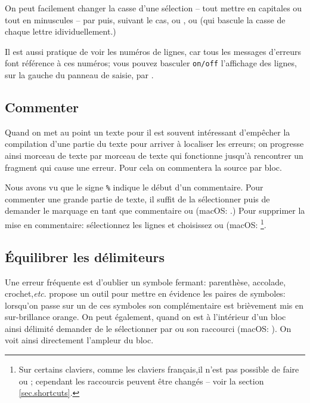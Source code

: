 On peut facilement changer la casse d'une sélection -- tout mettre en capitales ou tout en minuscules -- par \submenu{} puis, suivant le cas,  ou , ou  (qui bascule la casse de chaque lettre idividuellement.)

Il est aussi pratique de voir les numéros de lignes, car tous les messages d'erreurs font référence à ces numéros; vous pouvez basculer \texttt{on/off} l'affichage des lignes, sur la gauche du panneau de saisie, par \submenu{}.

\subsection{Commenter}

Quand on met au point un texte pour \AllTeX{} il est souvent intéressant d'empêcher la compilation d'une partie du texte pour arriver à localiser les erreurs; on progresse ainsi morceau de texte par morceau de texte qui fonctionne jusqu'à rencontrer un fragment qui cause une erreur. Pour cela on commentera la source par bloc. 

Nous avons vu que le signe \verb|%| indique le début d'un commentaire. Pour commenter une grande partie de texte, il suffit de la sélectionner puis de demander le marquage en tant que commentaire \submenu{} ou  (macOS: \keysequence{Cmd+Shift+]}.) Pour supprimer la mise en commentaire: sélectionnez les lignes et choisissez \submenu{} ou  (macOS: \keysequence{Cmd+Maj+[} \footnote{Sur certains claviers, comme les claviers français,il n'est pas possible de faire \keysequence{Ctrl+Maj+[} ou \keysequence{Ctrl+Maj+]}; cependant les raccourcis peuvent être changés -- voir la section \ref{sec.shortcuts}.}. 

\subsection{Équilibrer les délimiteurs}

Une erreur fréquente est d'oublier un symbole fermant: parenthèse, accolade, crochet,\emph{etc}. \Tw{} propose un outil pour mettre en évidence les paires de symboles: lorsqu'on passe sur un de ces symboles son complémentaire est brièvement mis en sur-brillance orange. On peut également, quand on est à l'intérieur d'un bloc ainsi délimité demander de le sélectionner par \submenu{} ou son raccourci  (macOS: ). On voit ainsi directement l'ampleur du bloc.

